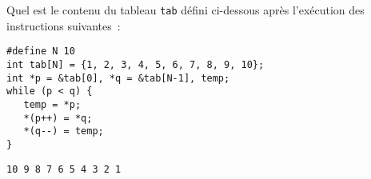 Quel est le contenu du tableau \verb+tab+ d\'efini ci-dessous apr\`es
l'ex\'ecution des instructions suivantes~:
\begin{verbatim}
#define N 10
int tab[N] = {1, 2, 3, 4, 5, 6, 7, 8, 9, 10};
int *p = &tab[0], *q = &tab[N-1], temp;
while (p < q) {
   temp = *p;
   *(p++) = *q;
   *(q--) = temp;
}
\end{verbatim}
\ifcorrection
\begin{correction}
\begin{verbatim}
10 9 8 7 6 5 4 3 2 1 
\end{verbatim}
\end{correction}
\fi
